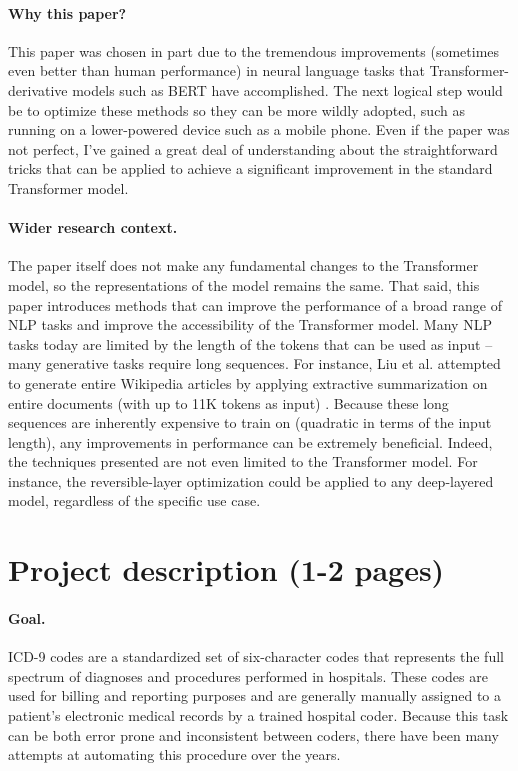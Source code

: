 \documentclass{article}
\begin{document}
\paragraph{Why this paper?}

This paper was chosen in part due to the tremendous improvements (sometimes even better than human performance) in neural language tasks that Transformer-derivative models such as BERT have accomplished. The next logical step would be to optimize these methods so they can be more wildly adopted, such as running on a lower-powered device such as a mobile phone. Even if the paper was not perfect, I’ve gained a great deal of understanding about the straightforward tricks that can be applied to achieve a significant improvement in the standard Transformer model.


\paragraph{Wider research context.}

The paper itself does not make any fundamental changes to the Transformer model, so the representations of the model remains the same. That said, this paper introduces methods that can improve the performance of a broad range of NLP tasks and improve the accessibility of the Transformer model. Many NLP tasks today are limited by the length of the tokens that can be used as input – many generative tasks require long sequences. For instance, Liu et al. attempted to generate entire Wikipedia articles by applying extractive summarization on entire documents (with up to 11K tokens as input) \cite{liu2018generating}. Because these long sequences are inherently expensive to train on (quadratic in terms of the input length), any improvements in performance can be extremely beneficial. Indeed, the techniques presented are not even limited to the Transformer model. For instance, the reversible-layer optimization could be applied to any deep-layered model, regardless of the specific use case. 




\section{Project description (1-2 pages)}

\paragraph{Goal.} 
ICD-9 codes are a standardized set of six-character codes that represents the full spectrum of diagnoses and procedures performed in hospitals. These codes are used for billing and reporting purposes and are generally manually assigned to a patient’s electronic medical records by a trained hospital coder. Because this task can be both error prone and inconsistent between coders, there have been many attempts at automating this procedure over the years. \cite{perotte2014diagnosis}
\end{document}
